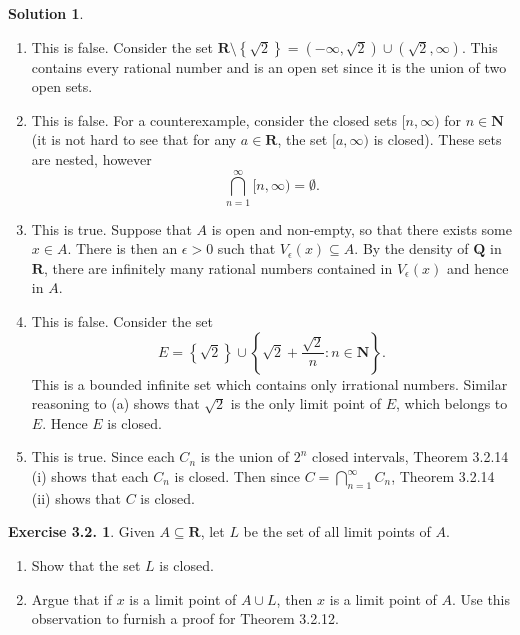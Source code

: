 \documentclass[12pt]{article}
\theoremstyle{definition}
\theoremstyle{exercise}
\newtheorem{exercise}{Exercise 3.2.}
\theoremstyle{solution}
\newtheorem*{solution}{Solution}
\newcommand{\N}{\mathbf{N}}
\newcommand{\Q}{\mathbf{Q}}
\newcommand{\R}{\mathbf{R}}
\begin{document}
\begin{solution}
    \begin{enumerate}
        \item This is false. Consider the set \( \R \setminus \left\{ \sqrt{2} \right\} = \left( -\infty, \sqrt{2} \right) \cup \left( \sqrt{2}, \infty \right) \). This contains every rational number and is an open set since it is the union of two open sets.
        
        \item This is false. For a counterexample, consider the closed sets \( [n, \infty) \) for \( n \in \N \) (it is not hard to see that for any \( a \in \R \), the set \( [a, \infty) \) is closed). These sets are nested, however
        \[
            \bigcap_{n=1}^{\infty} [n, \infty) = \emptyset.
        \]

        \item This is true. Suppose that \( A \) is open and non-empty, so that there exists some \( x \in A \). There is then an \( \epsilon > 0 \) such that \( V_{\epsilon}(x) \subseteq A \). By the density of \( \Q \) in \( \R \), there are infinitely many rational numbers contained in \( V_{\epsilon}(x) \) and hence in \( A \).

        \item This is false. Consider the set
        \[
            E = \left\{ \sqrt{2} \right\} \cup \left\{ \sqrt{2} + \frac{\sqrt{2}}{n} : n \in \N \right\}.
        \]
        This is a bounded infinite set which contains only irrational numbers. Similar reasoning to  (a) shows that \( \sqrt{2} \) is the only limit point of \( E \), which belongs to \( E \). Hence \( E \) is closed.

        \item This is true. Since each \( C_n \) is the union of \( 2^n \) closed intervals, Theorem 3.2.14 (i) shows that each \( C_n \) is closed. Then since \( C = \bigcap_{n=1}^{\infty} C_n \), Theorem 3.2.14 (ii) shows that \( C \) is closed.
    \end{enumerate}
\end{solution}

\begin{exercise}
\label{ex:7}
    Given \( A \subseteq \R \), let \( L \) be the set of all limit points of \( A \).
    \begin{enumerate}
        \item Show that the set \( L \) is closed.

        \item Argue that if \( x \) is a limit point of \( A \cup L \), then \( x \) is a limit point of \( A \). Use this observation to furnish a proof for Theorem 3.2.12.
    \end{enumerate}
\end{exercise}
\end{document}
